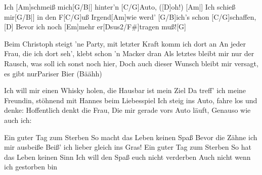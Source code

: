 \begin{guitar}
	 
	
	Ich [Am]schmeiß mich[G/B|] hinter'n [C/G]Auto, ([D]oh!)
	[Am|] Ich schieß mir[G/B|] in den F[C/G]uß
	Irgend[Am]wie werd' [G/B]ich's schon [C/G]schaffen,[D]{}
	Bevor ich noch [Em]mehr er[Dsus2/F#]tragen muß![G]{}
	
	Beim Christoph steigt 'ne Party, mit letzter Kraft komm ich dort an
	An jeder Frau, die ich dort seh', klebt schon 'n Macker dran
	Als letztes bleibt mir nur der Rausch, was soll ich sonst noch hier,
	Doch auch dieser Wunsch bleibt mir versagt, es gibt nurPariser Bier (Bäähh)
	
	Ich will mir einen Whisky holen, die Hausbar ist mein Ziel
	Da treff' ich meine Freundin, stöhnend mit Hannes beim Liebesspiel
	Ich steig ins Auto, fahre los und denke: Hoffentlich denkt die Frau,
	Die mir gerade vors Auto läuft, Genauso wie auch ich:
	
	Ein guter Tag zum Sterben
	So macht das Leben keinen Spaß
	Bevor die Zähne ich mir ausbeiße
	Beiß' ich lieber gleich ins Gras!
	Ein guter Tag zum Sterben
	So hat das Leben keinen Sinn
	Ich will den Spaß euch nicht verderben
	Auch nicht wenn ich gestorben bin
\end{guitar}
